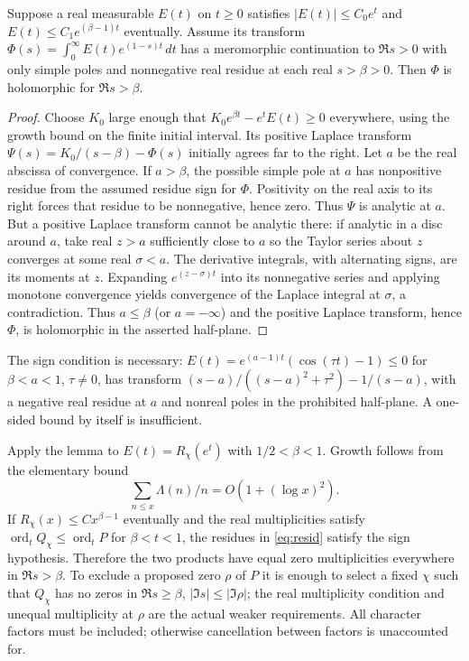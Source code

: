 \documentclass[11pt,a4paper]{article}
\begin{document}
\begin{lemma}\label{lem:landau}
Suppose a real measurable $E(t)$ on $t\geq0$ satisfies $|E(t)|\leq C_0e^t$ and $E(t)\leq C_1e^{(\beta-1)t}$ eventually. Assume its transform $\Phi(s)=\int_0^\infty E(t)e^{(1-s)t}\,dt$ has a meromorphic continuation to $\Re s>0$ with only simple poles and nonnegative real residue at each real $s>\beta>0$. Then $\Phi$ is holomorphic for $\Re s>\beta$.
\end{lemma}
\begin{proof}
Choose $K_0$ large enough that $K_0e^{\beta t}-e^tE(t)\geq0$ everywhere, using the growth bound on the finite initial interval. Its positive Laplace transform $\Psi(s)=K_0/(s-\beta)-\Phi(s)$ initially agrees far to the right. Let $a$ be the real abscissa of convergence. If $a>\beta$, the possible simple pole at $a$ has nonpositive residue from the assumed residue sign for $\Phi$. Positivity on the real axis to its right forces that residue to be nonnegative, hence zero. Thus $\Psi$ is analytic at $a$. But a positive Laplace transform cannot be analytic there: if analytic in a disc around $a$, take real $z>a$ sufficiently close to $a$ so the Taylor series about $z$ converges at some real $\sigma<a$. The derivative integrals, with alternating signs, are its moments at $z$. Expanding $e^{(z-\sigma)t}$ into its nonnegative series and applying monotone convergence yields convergence of the Laplace integral at $\sigma$, a contradiction. Thus $a\leq\beta$ (or $a=-\infty$) and the positive Laplace transform, hence $\Phi$, is holomorphic in the asserted half-plane.
\end{proof}
The sign condition is necessary: $E(t)=e^{(a-1)t}(\cos(\tau t)-1)\leq0$ for $\beta<a<1$, $\tau\ne0$, has transform $(s-a)/((s-a)^2+\tau^2)-1/(s-a)$, with a negative real residue at $a$ and nonreal poles in the prohibited half-plane. A one-sided bound by itself is insufficient.

Apply the lemma to $E(t)=R_\chi(e^t)$ with $1/2<\beta<1$. Growth follows from the elementary bound
\[\sum_{n\leq x}\Lambda(n)/n=O(1+(\log x)^2).\] If $R_\chi(x)\leq Cx^{\beta-1}$ eventually and the real multiplicities satisfy $\operatorname{ord}_t Q_\chi\leq\operatorname{ord}_t P$ for $\beta<t<1$, the residues in \eqref{eq:resid} satisfy the sign hypothesis. Therefore the two products have equal zero multiplicities everywhere in $\Re s>\beta$. To exclude a proposed zero $\rho$ of $P$ it is enough to select a fixed $\chi$ such that $Q_\chi$ has no zeros in $\Re s\geq\beta$, $|\Im s|\leq|\Im\rho|$; the real multiplicity condition and unequal multiplicity at $\rho$ are the actual weaker requirements. All character factors must be included; otherwise cancellation between factors is unaccounted for.
\end{document}
